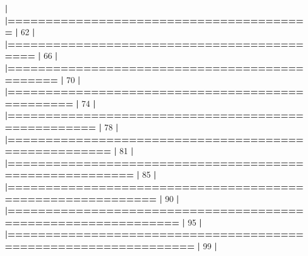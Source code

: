 \documentclass[]{book}
\newenvironment{Shaded}{\begin{snugshade}}{\end{snugshade}}
\newcommand{\DecValTok}[1]{\textcolor[rgb]{0.00,0.00,0.81}{#1}}
\newcommand{\ErrorTok}[1]{\textcolor[rgb]{0.64,0.00,0.00}{\textbf{#1}}}
\newcommand{\NormalTok}[1]{#1}
\newcommand{\OperatorTok}[1]{\textcolor[rgb]{0.81,0.36,0.00}{\textbf{#1}}}
\newcommand{\StringTok}[1]{\textcolor[rgb]{0.31,0.60,0.02}{#1}}
\begin{document}
\begin{Shaded}
\begin{Highlighting}[]
{{{{{{{{{{{{{{{{{{{  \OperatorTok{|}\StringTok{                                                                       }
\StringTok{  }\ErrorTok{|========================================}\StringTok{                         }\ErrorTok{|}\StringTok{  }\DecValTok{62}\NormalTok{%}
  \OperatorTok{|}\StringTok{                                                                       }
\StringTok{  }\ErrorTok{|===========================================}\StringTok{                      }\ErrorTok{|}\StringTok{  }\DecValTok{66}\NormalTok{%}
  \OperatorTok{|}\StringTok{                                                                       }
\StringTok{  }\ErrorTok{|==============================================}\StringTok{                   }\ErrorTok{|}\StringTok{  }\DecValTok{70}\NormalTok{%}
  \OperatorTok{|}\StringTok{                                                                       }
\StringTok{  }\ErrorTok{|================================================}\StringTok{                 }\ErrorTok{|}\StringTok{  }\DecValTok{74}\NormalTok{%}
  \OperatorTok{|}\StringTok{                                                                       }
\StringTok{  }\ErrorTok{|===================================================}\StringTok{              }\ErrorTok{|}\StringTok{  }\DecValTok{78}\NormalTok{%}
  \OperatorTok{|}\StringTok{                                                                       }
\StringTok{  }\ErrorTok{|=====================================================}\StringTok{            }\ErrorTok{|}\StringTok{  }\DecValTok{81}\NormalTok{%}
  \OperatorTok{|}\StringTok{                                                                       }
\StringTok{  }\ErrorTok{|========================================================}\StringTok{         }\ErrorTok{|}\StringTok{  }\DecValTok{85}\NormalTok{%}
  \OperatorTok{|}\StringTok{                                                                       }
\StringTok{  }\ErrorTok{|===========================================================}\StringTok{      }\ErrorTok{|}\StringTok{  }\DecValTok{90}\NormalTok{%}
  \OperatorTok{|}\StringTok{                                                                       }
\StringTok{  }\ErrorTok{|==============================================================}\StringTok{   }\ErrorTok{|}\StringTok{  }\DecValTok{95}\NormalTok{%}
  \OperatorTok{|}\StringTok{                                                                       }
\StringTok{  }\ErrorTok{|================================================================}\StringTok{ }\ErrorTok{|}\StringTok{  }\DecValTok{99}\NormalTok{%}
  \OperatorTok{|}\StringTok{                                                                       }
}}}}}}}}}}}}}}}}}}}}}}}}}}}}}
\end{Highlighting}
\end{Shaded}
\end{document}
